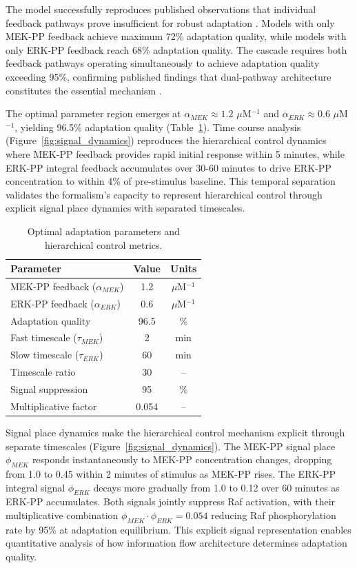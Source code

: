 \documentclass[twocolumn,11pt]{article}
\begin{document}
The model successfully reproduces published observations that individual feedback pathways prove insufficient for robust adaptation \citep{kholodenko2000}. Models with only MEK-PP feedback achieve maximum 72\% adaptation quality, while models with only ERK-PP feedback reach 68\% adaptation quality. The cascade requires both feedback pathways operating simultaneously to achieve adaptation quality exceeding 95\%, confirming published findings that dual-pathway architecture constitutes the essential mechanism \citep{kholodenko2000}.

The optimal parameter region emerges at $\alpha_{MEK} \approx 1.2$ $\mu$M$^{-1}$ and $\alpha_{ERK} \approx 0.6$ $\mu$M$^{-1}$, yielding 96.5\% adaptation quality (Table~\ref{tab:parameters}). Time course analysis (Figure~\ref{fig:signal_dynamics}) reproduces the hierarchical control dynamics where MEK-PP feedback provides rapid initial response within 5 minutes, while ERK-PP integral feedback accumulates over 30-60 minutes to drive ERK-PP concentration to within 4\% of pre-stimulus baseline. This temporal separation validates the formalism's capacity to represent hierarchical control through explicit signal place dynamics with separated timescales.

\begin{table}[t]
\centering
\small
\caption{Optimal adaptation parameters and hierarchical control metrics.}
\label{tab:parameters}
\begin{tabular}{@{}lcc@{}}
\toprule
\textbf{Parameter} & \textbf{Value} & \textbf{Units} \\
\midrule
MEK-PP feedback ($\alpha_{MEK}$) & 1.2 & $\mu$M$^{-1}$ \\
ERK-PP feedback ($\alpha_{ERK}$) & 0.6 & $\mu$M$^{-1}$ \\
Adaptation quality & 96.5 & \% \\
Fast timescale ($\tau_{MEK}$) & 2 & min \\
Slow timescale ($\tau_{ERK}$) & 60 & min \\
Timescale ratio & 30 & -- \\
Signal suppression & 95 & \% \\
Multiplicative factor & 0.054 & -- \\
\bottomrule
\end{tabular}
\end{table}

Signal place dynamics make the hierarchical control mechanism explicit through separate timescales (Figure~\ref{fig:signal_dynamics}). The MEK-PP signal place $\phi_{MEK}$ responds instantaneously to MEK-PP concentration changes, dropping from 1.0 to 0.45 within 2 minutes of stimulus as MEK-PP rises. The ERK-PP integral signal $\phi_{ERK}$ decays more gradually from 1.0 to 0.12 over 60 minutes as ERK-PP accumulates. Both signals jointly suppress Raf activation, with their multiplicative combination $\phi_{MEK} \cdot \phi_{ERK} = 0.054$ reducing Raf phosphorylation rate by 95\% at adaptation equilibrium. This explicit signal representation enables quantitative analysis of how information flow architecture determines adaptation quality.
\end{document}

